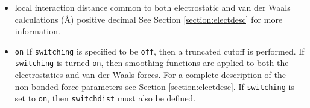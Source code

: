 \begin{itemize}


\item
{}
{local interaction distance common to both electrostatic 
and van der Waals calculations (\AA)}
{positive decimal}
{%
See Section \ref{section:electdesc} for more information.}

\item
{}
{{\tt on}}
{If {\tt switching} is
specified to be {\tt off}, then a truncated cutoff is performed.
If {\tt switching} is turned {\tt on}, then smoothing functions
are applied to both the electrostatics and van der Waals forces.
For a complete description of the non-bonded force parameters see
Section \ref{section:electdesc}.  If {\tt switching} is set to
{\tt on}, then {\tt switchdist} must also be defined.}



\end{itemize}
